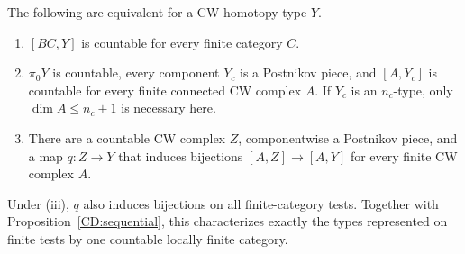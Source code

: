 \begin{theorem}
\label{CD:alltargets}
The following are equivalent for a CW homotopy type $Y$.
\begin{enumerate}[label=(\roman*)]
\item $[BC,Y]$ is countable for every finite category $C$.
\item $\pi_0Y$ is countable, every component $Y_c$ is a Postnikov piece,
and $[A,Y_c]$ is countable for every finite connected CW complex $A$.
If $Y_c$ is an $n_c$-type, only $\dim A\le n_c+1$ is necessary here.
\item There are a countable CW complex $Z$, componentwise a Postnikov
piece, and a map $q:Z\to Y$ that induces bijections
$[A,Z]\to[A,Y]$ for every finite CW complex $A$.
\end{enumerate}
Under (iii), $q$ also induces bijections on all finite-category tests.
Together with Proposition~\ref{CD:sequential}, this characterizes exactly
the types represented on finite tests by one countable locally finite
category.
\end{theorem}
